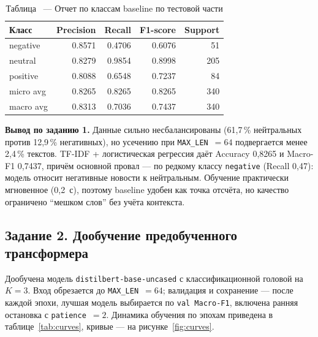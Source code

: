 \documentclass[14pt,a4paper]{extarticle}
\begin{document}
\begin{table}[H]
    \centering
    \caption*{\raggedleft Таблица \thetable\ --- Отчет по классам baseline по тестовой части}
    \label{tab:base_report}
    \begin{tabular}{lrrrr}
        \toprule
        Класс & Precision & Recall & F1-score & Support \\
        \midrule
        negative & 0.8571 & 0.4706 & 0.6076 & 51 \\
        neutral  & 0.8279 & 0.9854 & 0.8998 & 205 \\
        positive & 0.8088 & 0.6548 & 0.7237 & 84 \\
        \midrule
        micro avg & 0.8265 & 0.8265 & 0.8265 & 340 \\
        macro avg & 0.8313 & 0.7036 & 0.7437 & 340 \\
        \bottomrule
    \end{tabular}
\end{table}

\noindent\textbf{Вывод по заданию 1.} Данные сильно несбалансированы (61{,}7\,\%
нейтральных против 12{,}9\,\% негативных), но усечению при \texttt{MAX\_LEN}~$=64$
подвергается менее 2{,}4\,\% текстов. TF-IDF + логистическая регрессия даёт
Accuracy 0{,}8265 и Macro-F1 0{,}7437, причём основной провал --- по редкому
классу \texttt{negative} (Recall 0{,}47): модель относит негативные новости к
нейтральным. Обучение практически мгновенное (0{,}2~с), поэтому baseline удобен
как точка отсчёта, но качество ограничено ``мешком слов'' без учёта контекста.

\subsection{Задание 2. Дообучение предобученного трансформера}

Дообучена модель \texttt{distilbert-base-uncased} с классификационной головой на
$K=3$. Вход обрезается до \texttt{MAX\_LEN}~$=64$; валидация и сохранение --- после
каждой эпохи, лучшая модель выбирается по \texttt{val Macro-F1}, включена ранняя
остановка с \texttt{patience}~$=2$. Динамика обучения по эпохам приведена в
таблице~\ref{tab:curves}, кривые --- на рисунке~\ref{fig:curves}.
\end{document}
